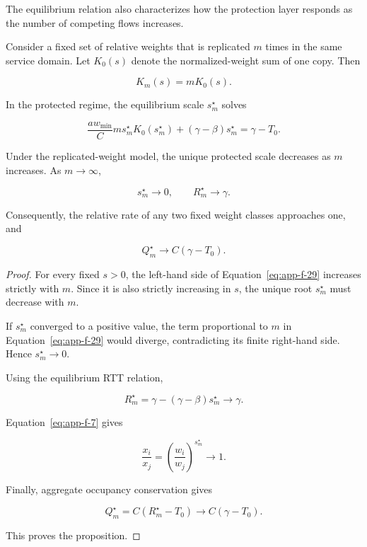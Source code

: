 The equilibrium relation also characterizes how the protection layer responds as the number of competing flows increases.

Consider a fixed set of relative weights that is replicated \(m\) times in the same service domain. Let \(K_0(s)\) denote the normalized-weight sum of one copy. Then

\begin{equation}
\label{eq:app-f-28}
K_m(s)=mK_0(s).
\end{equation}

In the protected regime, the equilibrium scale \(s_m^\star\) solves

\begin{equation}
\label{eq:app-f-29}
\frac{aw_{\min}}{C}
m s_m^\star K_0(s_m^\star)
+(\gamma-\beta)s_m^\star
=\gamma-T_0.
\end{equation}

\begin{proposition}
\label{prop:f-1}
Under the replicated-weight model, the unique protected scale decreases as \(m\) increases. As \(m\to\infty\),

\begin{equation}
\label{eq:app-f-30}
s_m^\star\longrightarrow0,
\qquad
R_m^\star\longrightarrow\gamma.
\end{equation}

Consequently, the relative rate of any two fixed weight classes approaches one, and

\begin{equation}
\label{eq:app-f-31}
Q_m^\star\longrightarrow C(\gamma-T_0).
\end{equation}
\end{proposition}

\begin{proof} For every fixed \(s>0\), the left-hand side of Equation~\eqref{eq:app-f-29} increases strictly with \(m\). Since it is also strictly increasing in \(s\), the unique root \(s_m^\star\) must decrease with \(m\).

If \(s_m^\star\) converged to a positive value, the term proportional to \(m\) in Equation~\eqref{eq:app-f-29} would diverge, contradicting its finite right-hand side. Hence \(s_m^\star\to0\).

Using the equilibrium RTT relation,

\[
R_m^\star
=\gamma-(\gamma-\beta)s_m^\star
\longrightarrow\gamma.
\]

Equation~\eqref{eq:app-f-7} gives

\[
\frac{x_i}{x_j}
=\left(\frac{w_i}{w_j}\right)^{s_m^\star}
\longrightarrow1.
\]

Finally, aggregate occupancy conservation gives

\[
Q_m^\star=C(R_m^\star-T_0)
\longrightarrow C(\gamma-T_0).
\]

This proves the proposition.
\end{proof}

